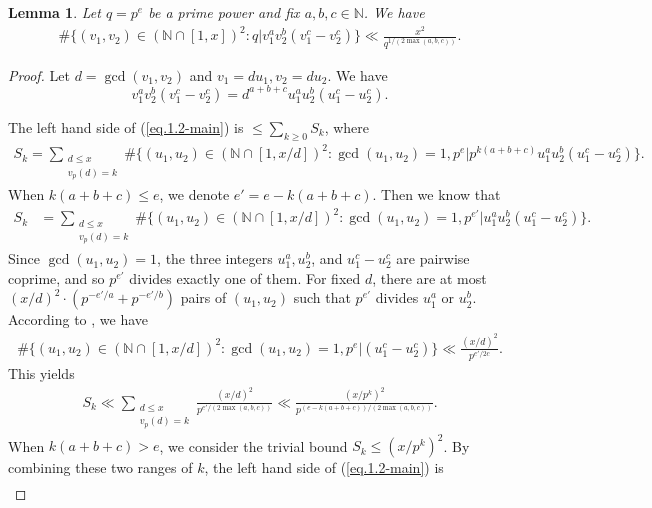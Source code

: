 \documentclass[reqno, 11pt]{amsart}
\renewcommand{\leq}{\leqslant}
\renewcommand{\geq}{\geqslant}
\newtheorem{lemma}[theorem]{Lemma}
\theoremstyle{definition}
\theoremstyle{definition}
\renewcommand{\geq}{\geqslant}
\renewcommand{\leq}{\leqslant}
\newcommand{\NN}{\mathbb{N}}
\numberwithin{equation}{section}
\begin{document}
\begin{lemma}\label{Lemma-1.2}
    Let $q = p^e$ be a prime power and fix $a,b,c \in \NN$. We have
    \begin{align}\label{eq.1.2-main}
        \# \{ (v_1, v_2) \in (\NN \cap [1,x])^2: q | v_1^{a} v_2^{b} (v_1^c - v_2^c) \} \ll \frac{x^2}{q^{1 / (2 \max (a,b,c))}}.
    \end{align}
\end{lemma}
\begin{proof}
    Let $d = \gcd(v_1, v_2)$ and $v_1 = d u_1, v_2 = d u_2$. We have
    $$v_1^a v_2^b (v_1^c - v_2^c) = d^{a+b+c} u_1^a u_2^b (u_1^c - u_2^c).$$

    The left hand side of (\ref{eq.1.2-main}) is $\leq \sum_{k \geq 0} S_k$, where 
    \begin{align*}
      S_k =  \sum_{\substack{d \leq x \\ v_p(d) = k}}  \#\{ (u_1, u_2) \in (\NN \cap [1,x/d])^2: \gcd(u_1, u_2) = 1, p^{e} | p^{k(a+b+c)} u_1^{a} u_2^{b} (u_1^c - u_2^c) \}.
    \end{align*}
    When $k(a+b+c) \leq e$, we denote $e' = e - k(a+b+c)$. Then we know that
    \begin{align*}
        S_k & = \sum_{\substack{d \leq x \\ v_p(d) = k}}  \#\{ (u_1, u_2) \in (\NN \cap [1,x/d])^2: \gcd(u_1, u_2) = 1, p^{e'} | u_1^{a} u_2^{b} (u_1^c - u_2^c) \}.
    \end{align*}
    Since $\gcd(u_1,u_2) = 1$, the three integers $u_1^a, u_2^b$, and $u_1^c - u_2^c$ are pairwise coprime, and so $p^{e'}$ divides exactly one of them. For fixed $d$, there are at most $(x/d)^2 \cdot (p^{-e'/a} + p^{-e'/b})$ pairs of $(u_1, u_2)$ such that $p^{e'}$ divides $u_1^a$ or $u_2^b$. According to \cite[Lemma 2.3]{BST}, we have
    \begin{align*}
       \#\{ (u_1, u_2) \in (\NN \cap [1,x/d])^2: \gcd(u_1, u_2) = 1, p^{e} | (u_1^c - u_2^c) \} \ll \frac{(x/d)^2}{p^{e' / 2c}}.
    \end{align*}
    This yields
    \begin{align*}
        S_k \ll \sum_{\substack{d \leq x \\ v_p(d) = k}} \frac{(x/d)^2}{p^{e' / (2 \max (a,b,c))}} \ll \frac{(x / p^k)^2}{p^{ (e - k(a+b+c) ) / (2 \max (a,b,c))}}.
    \end{align*}
    When $k(a+b+c) > e$, we consider the trivial bound $S_k \leq (x / p^k)^2$. By combining these two ranges of $k$, the left hand side of (\ref{eq.1.2-main}) is 
    \begin{align*}

\end{align*}
\end{proof}
\end{document}

